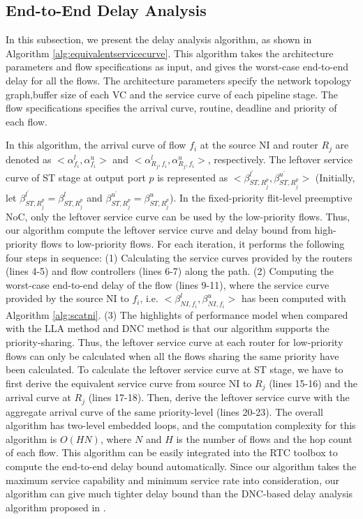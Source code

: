 \documentclass[preprint]{elsarticle}
\begin{document}
\subsection{End-to-End Delay Analysis}\label{e2elatency}
In this subsection, we present the delay analysis algorithm, as shown in Algorithm \ref{alg:equivalentservicecurve}. This algorithm takes the architecture parameters and flow specifications as input, and gives the worst-case end-to-end delay for all the flows. The architecture parameters specify the network topology graph,buffer size of each VC and the service curve of each pipeline stage. The flow specifications specifies the arrival curve, routine, deadline and priority of each flow.

In this algorithm, the arrival curve of flow $f_i$ at the source NI and router $R_j$ are denoted as $<\alpha_{f_i}^l,\alpha_{f_i}^u>$ and $<\alpha_{R_j,f_i}^l,\alpha_{R_j,f_i}^u>$, respectively. The leftover service curve of ST stage at output port $p$ is represented as $<\beta_{ST,R_j^{p}}^{l^\prime},\beta_{ST,R_j^{p}}^{u^\prime}>$ (Initially, let $\beta_{ST,R_j^{p}}^{l^\prime}=\beta_{ST,R_j^{p}}^{l}$ and $\beta_{ST,R_j^{p}}^{u^\prime}=\beta_{ST,R_j^{p}}^{u}$). In the fixed-priority flit-level preemptive NoC, only the leftover service curve can be used by the low-priority flows. Thus, our algorithm compute the leftover service curve and delay bound from high-priority flows to low-priority flows. For each iteration, it performs the following four steps in sequence: (1) Calculating the service curves provided by the routers (lines 4-5) and flow controllers (lines 6-7) along the path. (2) Computing the worst-case end-to-end delay of the flow (lines 9-11), where the service curve provided by the source NI to $f_i$, i.e. $<\beta_{NI,f_i}^l,\beta_{NI,f_i}^u>$ has been computed with Algorithm \ref{alg:scatni}. (3) The highlights of performance model when compared with the LLA method \cite{73} and DNC method \cite{Qian489900} is that our algorithm supports the priority-sharing. Thus, the leftover service curve at each router for low-priority flows can only be calculated when all the flows sharing the same priority have been calculated. To calculate the leftover service curve at ST stage, we have to first derive the equivalent service curve from source NI to $R_j$ (lines 15-16) and the arrival curve at $R_j$ (lines 17-18). Then, derive the leftover service curve with the aggregate arrival curve of the same priority-level (lines 20-23). The overall algorithm has two-level embedded loops, and the computation complexity for this algorithm is $O(HN)$, where $N$ and $H$ is the number of flows and the hop count of each flow. This algorithm can be easily integrated into the RTC toolbox \cite{rtc} to compute the end-to-end delay bound automatically. Since our algorithm takes the maximum service capability and minimum service rate into consideration, our algorithm can give much tighter delay bound than the DNC-based delay analysis algorithm proposed in \cite{Qian489900}.
\end{document}
